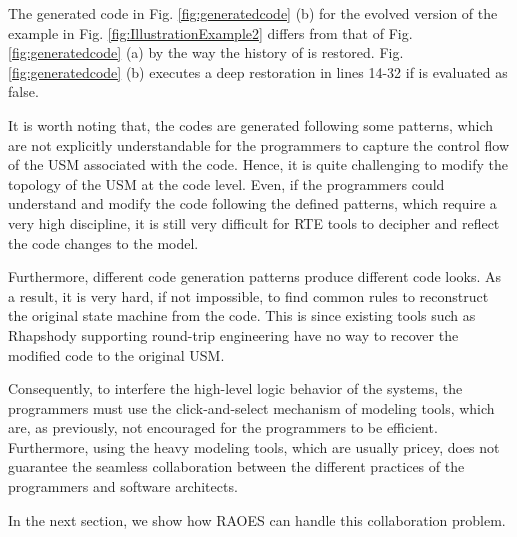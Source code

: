 The generated code in Fig. \ref{fig:generatedcode} (b) for the evolved version of the example in Fig. \ref{fig:IllustrationExample2} differs from that of Fig. \ref{fig:generatedcode} (a) by the way the history of  is restored.
Fig. \ref{fig:generatedcode} (b) executes a deep restoration in lines 14-32 if  is evaluated as false.

It is worth noting that, the codes are generated following some patterns, which are not explicitly understandable for the programmers to capture the control flow of the USM associated with the code.
Hence, it is quite challenging to modify the topology of the USM at the code level. 
Even, if the programmers could understand and modify the code following the defined patterns, which require a very high discipline, it is still very difficult for RTE tools to decipher and reflect the code changes to the model.

Furthermore, different code generation patterns produce different code looks.
As a result, it is very hard, if not impossible, to find common rules to reconstruct the original state machine from the code. 
This is since existing tools such as Rhapshody supporting round-trip engineering have no way to recover the modified code to the original USM.

Consequently, to interfere the high-level logic behavior of the systems, the programmers must use the click-and-select mechanism of modeling tools, which are, as previously, not encouraged for the programmers to be efficient. 
Furthermore, using the heavy modeling tools, which are usually pricey, does not guarantee the seamless collaboration between the different practices of the programmers and software architects.  

In the next section, we show how RAOES can handle this collaboration problem.